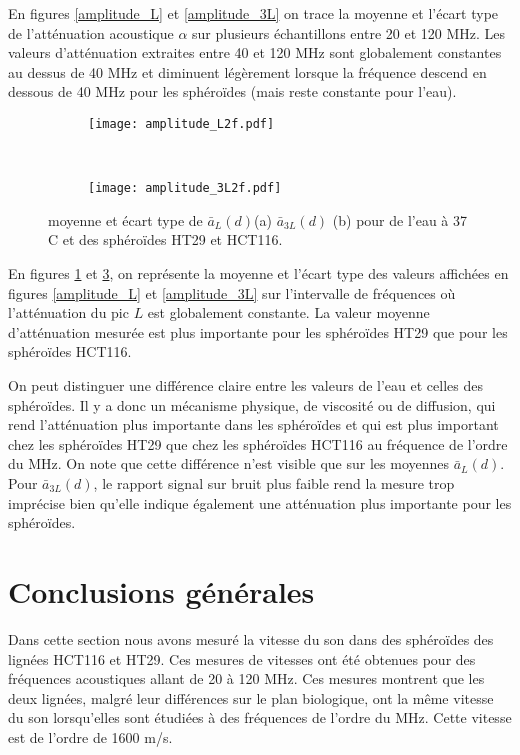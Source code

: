 En figures \ref{amplitude_L} et \ref{amplitude_3L} on trace la moyenne et l'écart type de l'atténuation acoustique  $\alpha$ sur plusieurs échantillons entre 20 et 120 MHz. Les valeurs d'atténuation extraites entre 40 et 120 MHz sont globalement constantes au dessus de 40 MHz et diminuent légèrement lorsque la fréquence descend en dessous de 40 MHz pour les sphéroïdes (mais reste constante pour l'eau). 
\begin{figure}[ht!]
\begin{subfigure}{0.49\textwidth}
\texttt{[image: amplitude\_L2f.pdf]}
\caption{\label{amplitude_Lf}}
\end{subfigure}
~~
\begin{subfigure}{0.49\textwidth}
\texttt{[image: amplitude\_3L2f.pdf]}
\caption{\label{amplitude_3Lf}}
\end{subfigure}
\caption{moyenne et écart type de $\bar{a}_L(d)$(a) $\bar{a}_{3L}(d)$ (b)  pour de l'eau à 37 \textdegree C et des sphéroïdes HT29 et HCT116.}
\end{figure}

En figures \ref{amplitude_Lf} et \ref{amplitude_3Lf}, on représente la moyenne et l'écart type des valeurs affichées en figures  \ref{amplitude_L} et \ref{amplitude_3L} sur l'intervalle de fréquences où l'atténuation du pic $L$ est globalement constante.
La valeur moyenne d'atténuation mesurée est plus importante pour les sphéroïdes HT29 que pour les sphéroïdes HCT116. 

 On peut distinguer une différence claire entre les valeurs de l'eau et celles des sphéroïdes. Il y a donc un mécanisme physique, de viscosité ou de diffusion, qui rend l'atténuation plus importante dans les sphéroïdes et qui est plus important chez les sphéroïdes HT29 que chez les sphéroïdes HCT116 au fréquence de l'ordre du MHz. On note que cette différence n'est visible que sur les moyennes $\bar{a}_L(d)$. Pour $\bar{a}_{3L}(d)$, le rapport signal sur bruit plus faible rend  la mesure trop imprécise bien qu'elle indique également une atténuation plus importante pour les sphéroïdes.


\section{Conclusions générales}
Dans cette section nous avons mesuré la vitesse du son dans des sphéroïdes des lignées HCT116 et HT29. Ces mesures de vitesses ont été obtenues pour des fréquences acoustiques allant de 20 à 120 MHz. Ces mesures montrent que les deux lignées, malgré leur différences sur le plan biologique, ont la même vitesse du son lorsqu'elles sont étudiées à des fréquences de l'ordre du MHz. Cette vitesse est de l'ordre de 1600 m/s. 

